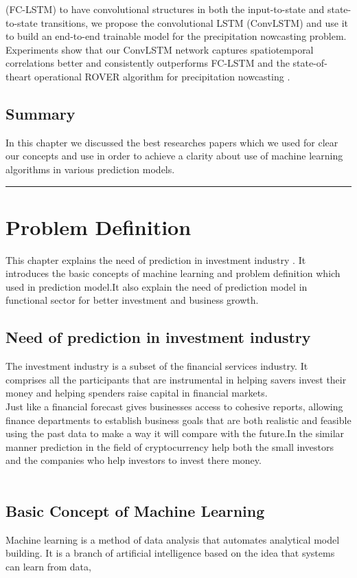 \documentclass[openany,12pt]{report}
\begin{document}
(FC-LSTM) to have convolutional structures in both the input-to-state and state-to-state transitions, we propose the convolutional LSTM (ConvLSTM) and use it to build an end-to-end trainable model for the precipitation nowcasting problem. Experiments show that our ConvLSTM network captures spatiotemporal correlations better and consistently outperforms FC-LSTM and the state-of-theart operational ROVER algorithm for precipitation nowcasting \cite{paper8}.\\
\section{Summary}
In this chapter we discussed the best researches papers which we used for clear our concepts and use in order to achieve a clarity about use of  machine learning algorithms in various prediction models.
\vfill
\hrule
\chapter{Problem Definition}
This chapter explains the need of prediction in  investment industry . It introduces the basic concepts of machine learning and problem definition which used in prediction model.It also explain the need of prediction model in functional sector for better investment and business growth.
\\
\section{Need of prediction in investment industry}
The investment industry is a subset of the financial services industry. It comprises all the participants that are instrumental in helping savers invest their money and helping spenders raise capital in financial markets.
\\
Just like a financial forecast gives businesses access to cohesive reports, allowing finance departments to establish business goals that are both realistic and feasible using the past data to make a way it will compare with the future.In the similar manner prediction in the field of cryptocurrency help both the small investors and the companies who help investors to invest there money.  
\\
\\
\section{Basic Concept of Machine Learning}
Machine learning is a method of data analysis that automates analytical model building. It is a branch of artificial intelligence based on the idea that systems can learn from data,
\end{document}
